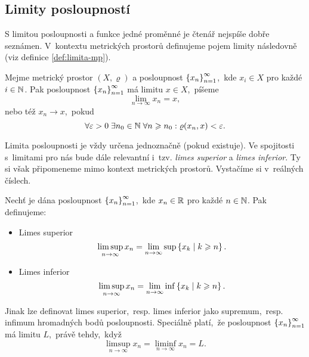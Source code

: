 \subsection{Limity posloupností}\label{subsec:limity-posl-mp}

S limitou posloupnosti a funkce jedné proměnné je čtenář nejspíše dobře seznámen. V~kontextu metrických prostorů definujeme pojem limity následovně (viz definice \ref{def:limita-mp}).
\begin{definition}\label{def:limita-mp}
    Mejme metrický prostor $(X,\varrho)$ a posloupnost $\left\{x_n\right\}_{n=1}^\infty$,~kde $x_i\in X$ pro každé $i\in\mathbb{N}$. Pak posloupnost $\left\{x_n\right\}_{n=1}^\infty$ má limitu $x\in X$,~píšeme
    \[\lim_{n\to\infty}x_n=x,\]
    nebo též $x_n\to x$,~pokud
    \[\forall\varepsilon>0\;\exists n_0\in\mathbb{N}\;\forall n\geqslant n_0: \varrho(x_n,x)<\varepsilon.\]
\end{definition}
Limita posloupnosti je vždy určena jednoznačně (pokud existuje). Ve spojitosti s~limitami pro nás bude dále relevantní i~tzv. \emph{limes superior} a \emph{limes inferior}. Ty si však připomeneme mimo kontext metrických prostorů. Vystačíme si v~reálných číslech.
\begin{definition}\label{def:limsup-liminf-mp}
    Nechť je dána posloupnost $\left\{x_n\right\}_{n=1}^\infty$,~kde $x_n\in\mathbb{R}$ pro každé $n\in\mathbb{N}$. Pak definujeme:
    \begin{itemize}
        \item Limes superior
        \[\limsup_{n\to\infty}x_n=\lim_{n\to\infty}\sup\left\{x_k\mid k\geqslant n\right\}.\]
        \item Limes inferior
        \[\limsup_{n\to\infty}x_n=\lim_{n\to\infty}\inf\left\{x_k\mid k\geqslant n\right\}.\]
    \end{itemize}
\end{definition}
Jinak lze definovat limes superior,~resp. limes inferior jako supremum,~resp. infimum hromadných bodů posloupnosti. Speciálně platí,~že posloupnost $\left\{x_n\right\}_{n=1}^\infty$ má limitu $L$,~právě tehdy,~když
\[\limsup_{n\to\infty}x_n=\liminf_{n\to\infty}x_n=L.\]

